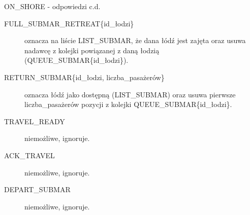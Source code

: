 \documentclass{beamer}
\begin{document}
\begin{frame}{ON\_SHORE - odpowiedzi c.d.}
    \internallinenumbers
    \resetlinenumber[1]
    \begin{description}
        \item [FULL\_SUBMAR\_RETREAT\{id\_łodzi\}] oznacza na liście LIST\_SUBMAR, że dana łódź jest zajęta oraz usuwa nadawcę z kolejki powiązanej z daną łodzią (QUEUE\_SUBMAR\{id\_łodzi\}).
        \item [RETURN\_SUBMAR\{id\_łodzi, liczba\_pasażerów\}] oznacza łódź jako dostępną (LIST\_SUBMAR) oraz usuwa pierwsze liczba\_pasażerów pozycji z kolejki QUEUE\_SUBMAR\{id\_łodzi\}.
        \item [TRAVEL\_READY] niemożliwe, ignoruje.
        \item [ACK\_TRAVEL] niemożliwe, ignoruje.
        \item [DEPART\_SUBMAR] niemożliwe, ignoruje.
    \end{description}
\end{frame}
\end{document}
